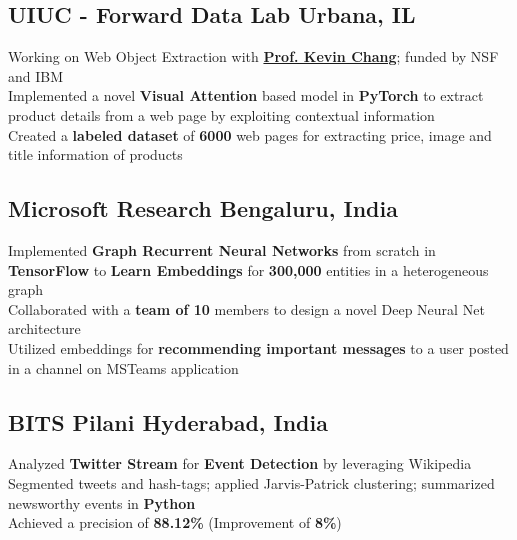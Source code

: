 \documentclass[]{Keval-resume}
\begin{document}
\subsection{UIUC - Forward Data Lab \hfill \normalfont U\lowercase{rbana}, IL}
\textbullet{} Working on Web Object Extraction with \href{http://www.forwarddatalab.org/kevinccchang}{\textbf{Prof. Kevin Chang}}; funded by NSF and IBM \\
\textbullet{} Implemented a novel \textbf{Visual Attention} based model in \textbf{PyTorch} to extract product details from a web page by exploiting contextual information \\
\textbullet{} Created a \textbf{labeled dataset} of \textbf{6000} web pages for extracting price, image and title information of products \\
\sectionsep

\subsection{Microsoft Research \hfill \normalfont B\lowercase{engaluru}, I\lowercase{ndia}}
\textbullet{} Implemented \textbf{Graph Recurrent Neural Networks} from scratch in \textbf{TensorFlow} to \textbf{Learn Embeddings} for \textbf{300,000} entities in a heterogeneous graph \\
\textbullet{} Collaborated with a \textbf{team of 10} members to design a novel Deep Neural Net architecture \\
\textbullet{} Utilized embeddings for \textbf{recommending important messages} to a user posted in a channel on MSTeams application
\sectionsep

\subsection{BITS Pilani \hfill \normalfont H\lowercase{yderabad}, I\lowercase{ndia}}
\textbullet{} Analyzed \textbf{Twitter Stream} for \textbf{Event Detection} by leveraging Wikipedia \\
\textbullet{} Segmented tweets and hash-tags; applied Jarvis-Patrick clustering; summarized newsworthy events in \textbf{Python}\\
\textbullet{} Achieved a precision of \textbf{88.12\%} (Improvement of \textbf{8\%})
\sectionsep
\end{document}
